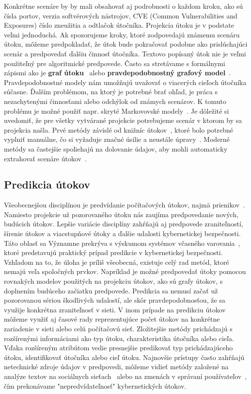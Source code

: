 \documentclass[thesismargins, thesislinespacing, openright, upjsfrontpage, combineabstracts]{rnthesis}
\begin{document}
Konkrétne scenáre by by mali obsahovať aj podrobnosti o každom kroku, ako sú čísla portov, verzia softvérových nástrojov, CVE (Common Vulnerabilities and Exposures) číslo zneužitia a odtlačok útočníka. Projekcia útoku je v podstate veľmi jednoduchá. Ak spozorujeme kroky, ktoré zodpovedajú známemu scenáru útoku, môžeme predpokladať, že útok bude pokračovať podobne ako prislúchajúci scenár a predpovedať ďalšiu činnosť útočníka. Textovo popísaný útok nie je veľmi použiteľný pre algoritmické predpovede. Často sa stretávame s formálnymi zápismi ako je \textbf{graf útoku}~\cite{hughes2003attack} alebo \textbf{pravdepodobnostný grafový model}~\cite{qin2004attack}. Pravdepodobnostné modely nám umožňujú uvažovať o viacerých cieľoch útočníka súčasne. Ďalším problémom, na ktorý je potrebné brať ohľad, je práca s nezachytenými činnosťami alebo odchýlok od známych scenárov. K tomuto problému je možné použiť napr. skryté Markovovské modely~\cite{farhadi2011alert}. Je dôležité si uvedomiť, že pre všetky vytvárané projekcie potrebujeme scenár v ktorom by sa projekcia našla. Prvé metódy závislé od knižníc útokov~\cite{qin2004attack}, ktoré bolo potrebné vyplniť manuálne, čo si vyžaduje značné úsilie a neustále úpravy~\cite{Yang2014}. Moderné metódy sa častejšie spoliehajú na dolovanie údajov, aby mohli automaticky extrahovať scenáre útokov~\cite{li2007data,farhadi2011alert,kim2014study}.

\subsection{Predikcia útokov}

Všeobecnejšou disciplínou je predvídanie počítačových útokov, najmä prienikov~\cite{Abdlhamed2017}. Namiesto projekcie už pozorovaného útoku nás zaujíma predpovedanie nových, budúcich útokov. Lepšie variácie disciplíny zahŕňajú aj predpovede zraniteľností, šírenie útokov a viacstupňové útoky a ďalšie udalosti kybernetickej bezpečnosti. Táto oblasť sa Významne prekrýva s výskumom systémov včasného varovania~\cite{ramaki2016survey}, ktoré predstavujú praktický prípad predikcie v kybernetickej bezpečnosti. Vzhľadom na to, že úloha je príliš všeobecná, existuje celý rad metód, ktoré nemajú veľa spoločných prvkov. Napríklad je možné predpovedať útoky pomocou rovnakých modelov použitých na projekciu útokov, ako sú grafy útokov, s doplnením budúceho začiatku predpovede. Predikcia sa nemusí začať už pozorovanou sériou škodlivých udalostí, ale skôr pravdepodobnosťou, že sa využije konkrétna zraniteľnosť v sieti. 
V inom prípade na predikciu útokov môžeme využiť aj časové rady reprezentujúce počet útokov na konkrétne zariadenie v sieti alebo celú počítačovú sieť. Zložitejšie metódy prichádzajú s rozšírenými informáciami ako typ útoku, charakteristika útočníka alebo cieľa. Vďaka rozšíreným atribútom vedie presnejšie predikovať typ prichádzajúceho útoku, identifikovať útočníka alebo cieľ útoku. Najnovšie prístupy často zahŕňajú netechnické zdroje údajov v predpovedi, môžeme vidieť metódy založené na analýze textov na sociálnych sieťach~\cite{hernandez2016security,shu2018understanding} alebo na zmenách v správaní používateľov~\cite{shao2016transparent}, čím prekonávame "nepredvídateľnosť" kybernetických útokov.
\end{document}
